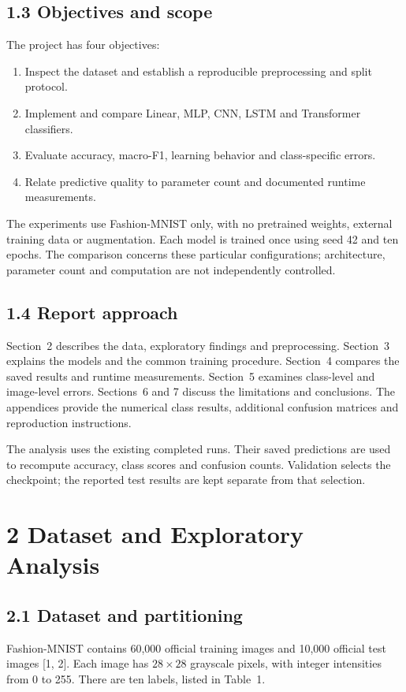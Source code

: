 \subsection{1.3 Objectives and scope}
The project has four objectives:
\begin{enumerate}
\item Inspect the dataset and establish a reproducible preprocessing and split protocol.
\item Implement and compare Linear, MLP, CNN, LSTM and Transformer classifiers.
\item Evaluate accuracy, macro-F1, learning behavior and class-specific errors.
\item Relate predictive quality to parameter count and documented runtime measurements.
\end{enumerate}

The experiments use Fashion-MNIST only, with no pretrained weights, external
training data or augmentation. Each model is trained once using seed 42 and ten
epochs. The comparison concerns these particular configurations; architecture,
parameter count and computation are not independently controlled.

\subsection{1.4 Report approach}
Section~2 describes the data, exploratory findings and preprocessing.
Section~3 explains the models and the common training procedure.
Section~4 compares the saved results and runtime measurements.
Section~5 examines class-level and image-level errors.
Sections~6 and 7 discuss the limitations and conclusions.
The appendices provide the numerical class results, additional confusion matrices
and reproduction instructions.

The analysis uses the existing completed runs. Their saved predictions are used
to recompute accuracy, class scores and confusion counts. Validation selects
the checkpoint; the reported test results are kept separate from that selection.


\section{2 Dataset and Exploratory Analysis}
\label{sec:dataset}
\subsection{2.1 Dataset and partitioning}
Fashion-MNIST contains 60,000 official training images and 10,000 official test
images [1, 2]. Each image has $28\times28$
grayscale pixels, with integer intensities from 0 to 255. There are ten labels,
listed in Table~1.

